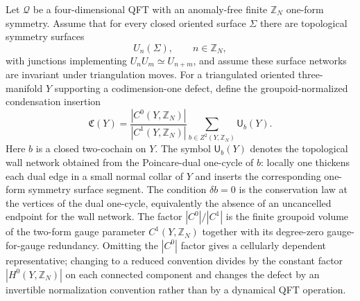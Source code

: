 \begin{definition}
\label{def:triangulated-higher-gauging-defect}
Let \(\mathcal Q\) be a four-dimensional QFT with an anomaly-free finite
\(\mathbb Z_N\) one-form symmetry.  Assume that for every closed oriented
surface \(\Sigma\) there are topological symmetry surfaces
\[
  U_n(\Sigma),\qquad n\in\mathbb Z_N,
\]
with junctions implementing \(U_nU_m\simeq U_{n+m}\), and assume these
surface networks are invariant under triangulation moves.  For a triangulated
oriented three-manifold \(Y\) supporting a codimension-one defect, define the
groupoid-normalized condensation insertion
\begin{equation}
  \mathfrak C(Y)
  =
  \frac{|C^0(Y,\mathbb Z_N)|}{|C^1(Y,\mathbb Z_N)|}
  \sum_{b\in Z^2(Y,\mathbb Z_N)}
  \mathsf U_b(Y).
  \label{eq:triangulated-one-form-condensation-defect}
\end{equation}
Here \(b\) is a closed two-cochain on \(Y\).  The symbol
\(\mathsf U_b(Y)\) denotes the topological wall network obtained from the
Poincare-dual one-cycle of \(b\): locally one thickens each dual edge in a
small normal collar of \(Y\) and inserts the corresponding one-form symmetry
surface segment.  The condition \(\delta b=0\) is the conservation law at the
vertices of the dual one-cycle, equivalently the absence of an uncancelled
endpoint for the wall network.  The factor
\(|C^0|/|C^1|\) is the finite groupoid volume of the two-form gauge
parameter \(C^1(Y,\mathbb Z_N)\) together with its degree-zero
gauge-for-gauge redundancy.  Omitting the \(|C^0|\) factor gives a
cellularly dependent representative; changing to a reduced convention divides
by the constant factor \(|H^0(Y,\mathbb Z_N)|\) on each connected component
and changes the defect by an invertible normalization convention rather than
by a dynamical QFT operation.
\end{definition}

